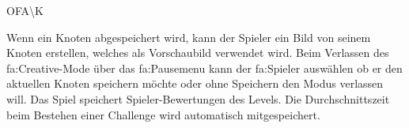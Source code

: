 \begin{ids}{\gls{OFA\K}}

	\id[ 470] Wenn ein Knoten abgespeichert wird, kann der Spieler ein Bild von seinem Knoten erstellen, welches als Vorschaubild verwendet wird.
	\id[ 480] Beim Verlassen des \gls{fa:Creative}-Mode über das \gls{fa:Pausemenu}  kann der \gls{fa:Spieler} auswählen ob er den aktuellen Knoten speichern möchte oder ohne Speichern den Modus verlassen will.
	\id[ 490] Das Spiel speichert Spieler-Bewertungen des Levels.
	\id[ 500] Die Durchschnittszeit beim Bestehen einer Challenge wird automatisch mitgespeichert.
	
 	
 	
	
\end{ids}

~\\